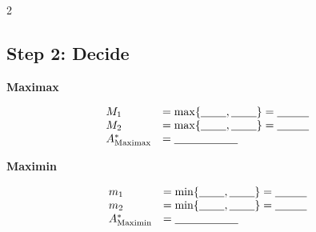\begin{multicols}{2}
		\subsection*{Step 2: Decide}
		
		\textbf{Maximax}
		
		\[
		\begin{array}{ll}
			M_1 &= \max\{\underline{\hspace{0.8cm}},\underline{\hspace{0.8cm}}\}
			=\underline{\hspace{1cm}} \\
			M_2 &= \max\{\underline{\hspace{0.8cm}},\underline{\hspace{0.8cm}}\}
			=\underline{\hspace{1cm}} \\
			A^*_{\mathrm{Maximax}} &= \underline{\hspace{2cm}}
		\end{array}
		\]
		
		\textbf{Maximin}
		
		\[
		\begin{array}{ll}
			m_1 &= \min\{\underline{\hspace{0.8cm}},\underline{\hspace{0.8cm}}\}
			=\underline{\hspace{1cm}} \\
			m_2 &= \min\{\underline{\hspace{0.8cm}},\underline{\hspace{0.8cm}}\}
			=\underline{\hspace{1cm}} \\
			A^*_{\mathrm{Maximin}} &= \underline{\hspace{2cm}}
		\end{array}
		\]
		

\end{multicols}
